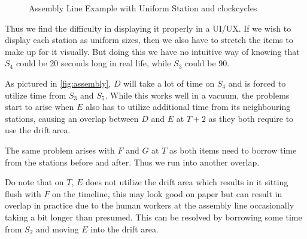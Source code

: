 \documentclass[12pt,a4paper]{report}
\begin{document}
\begin{figure}[ht]
    \caption{Assembly Line Example with Uniform Station and clockcycles}
    \label{fig:assembly}
\end{figure}

Thus we find the difficulty in displaying it properly in a UI/UX. If we wish to display each station as uniform sizes, then we also have to stretch the items to make up for it visually. But doing this we have no intuitive way of knowing that $S_4$ could be 20 seconds long in real life, while $S_3$ could be 90.

As pictured in \autoref{fig:assembly}, $D$ will take a lot of time on $S_4$ and is forced to utilize time from $S_3$ and $S_5$. 
While this works well in a vacuum, the problems start to arise when $E$ also has to utilize additional time from its neighbouring stations, causing an overlap between $D$ and $E$ at $T+2$ as they both require to use the drift area.

The same problem arises with $F$ and $G$ at $T$ as both items need to borrow time from the stations before and after. Thus we run into another overlap.

Do note that on $T$, $E$ does not utilize the drift area which results in it sitting flush with $F$ on the timeline, this may look good on paper but can result in overlap in practice due to the human workers at the assembly line occasionally taking a bit longer than presumed. This can be resolved by borrowing some time from $S_2$ and moving $E$ into the drift area. 
\end{document}
